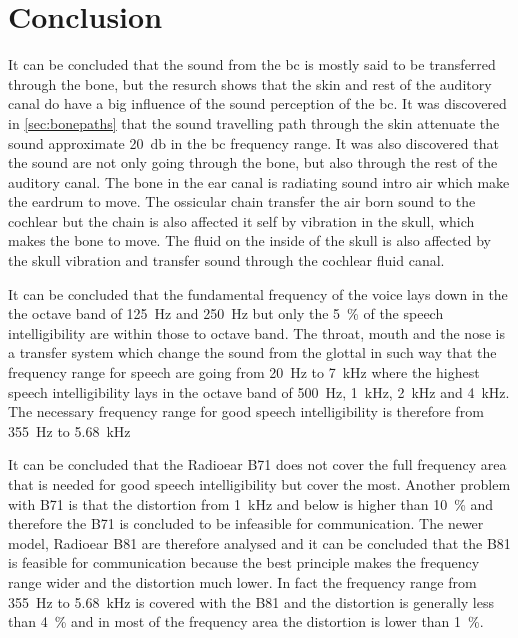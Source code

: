 \section{Conclusion}

It can be concluded that the sound from the \gls{bc} is mostly said to be transferred through the bone, but the resurch shows that the skin and rest of the auditory canal do have a big influence of the sound perception of the \gls{bc}. It was discovered in \autoref{sec:bonepaths} that the sound travelling path through the skin attenuate the sound approximate \SI{20}{\decibel} in the \gls{bc} frequency range. It was also discovered that the sound are not only going through the bone, but also through the rest of the auditory canal. The bone in the ear canal is radiating sound intro air which make the eardrum to move. The ossicular chain transfer the air born sound to the cochlear but the chain is also affected it self by vibration in the skull, which makes the bone to move. The fluid on the inside of the skull is also affected by the skull vibration and transfer sound through the cochlear fluid canal.  

It can be concluded that the fundamental frequency of the voice lays down in the the octave band of \SI{125}{\hertz} and \SI{250}{\hertz} but only the \SI{5}{\percent} of the speech intelligibility are within those to octave band. The throat, mouth and the nose is a transfer system which change the sound from the glottal in such way that the frequency range for speech are going from \SI{20}{\hertz} to \SI{7}{\kilo\hertz} where the highest speech intelligibility lays in the octave band of \SI{500}{\hertz}, \SI{1}{\kilo\hertz}, \SI{2}{\kilo\hertz} and \SI{4}{\kilo\hertz}. The necessary frequency range for good speech intelligibility is therefore from \SI{355}{\hertz} to \SI{5.68}{\kilo\hertz}

It can be concluded that the Radioear B71 does not cover the full frequency area that is needed for good speech intelligibility but cover the most. Another problem with B71 is that the distortion from \SI{1}{\kilo\hertz} and below is higher than \SI{10}{\percent} and therefore the B71 is concluded to be infeasible for communication. The newer model, Radioear B81 are therefore analysed and it can be concluded that the B81 is feasible for communication because the \gls{best} principle makes the frequency range wider and the distortion much lower. In fact the frequency range from \SI{355}{\hertz} to \SI{5.68}{\kilo\hertz} is covered with the B81 and the distortion is generally less than \SI{4}{\percent} and in most of the frequency area the distortion is lower than \SI{1}{\percent}.